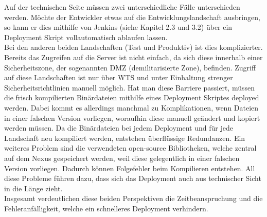 Auf der technischen Seite müssen zwei unterschiedliche Fälle unterschieden werden. Möchte der Entwickler etwas auf die Entwicklungslandschaft ausbringen, so kann er dies mithilfe von Jenkins (siehe Kapitel 2.3 und 3.2) über ein Deployment Skript vollautomatisch ablaufen lassen.\\
Bei den anderen beiden Landschaften (Test und Produktiv) ist dies komplizierter. Bereits das Zugreifen auf die Server ist nicht einfach, da sich diese innerhalb einer Sicherheitszone, der sogenannten \acs{DMZ} (demilitarisierte Zone), befinden. Zugriff auf diese Landschaften ist nur über \acs{WTS} und unter Einhaltung strenger Sicherheitsrichtlinien manuell möglich. Hat man diese Barriere passiert, müssen die frisch kompilierten Binärdateien mithilfe eines Deployment Skriptes deployed werden. Dabei kommt es allerdings manchmal zu Komplikationen, wenn Dateien in einer falschen Version vorliegen, woraufhin diese manuell geändert und kopiert werden müssen. 
Da die Binärdateien bei jedem Deployment und für jede Landschaft neu kompiliert werden, entstehen überflüssige Redundanzen. Ein weiteres Problem sind die verwendeten open-source Bibliotheken, welche zentral auf dem Nexus gespeichert werden, weil diese gelegentlich in einer falschen Version vorliegen. Dadurch können Folgefehler beim Kompilieren entstehen. All diese Probleme führen dazu, dass sich das Deployment auch aus technischer Sicht  in die Länge zieht.\\
Insgesamt verdeutlichen diese beiden Perspektiven die Zeitbeanspruchung und die Fehleranfälligkeit, welche ein schnelleres Deployment verhindern. %



